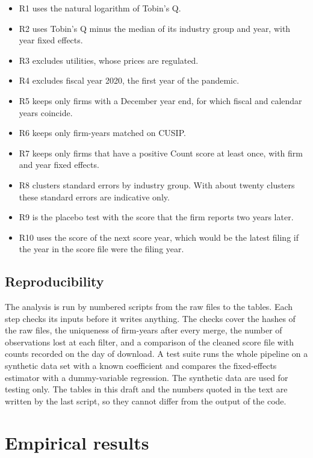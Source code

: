 \documentclass[12pt,a4paper]{article}
\begin{document}
\begin{itemize}
\item R1 uses the natural logarithm of Tobin's Q.
\item R2 uses Tobin's Q minus the median of its industry group and year, with year fixed effects.
\item R3 excludes utilities, whose prices are regulated.
\item R4 excludes fiscal year 2020, the first year of the pandemic.
\item R5 keeps only firms with a December year end, for which fiscal and calendar years coincide.
\item R6 keeps only firm-years matched on CUSIP.
\item R7 keeps only firms that have a positive Count score at least once, with firm and year fixed effects.
\item R8 clusters standard errors by industry group. With about twenty clusters these standard errors are indicative only.
\item R9 is the placebo test with the score that the firm reports two years later.
\item R10 uses the score of the next score year, which would be the latest filing if the year in the score file were the filing year.
\end{itemize}

\subsection{Reproducibility}

The analysis is run by numbered scripts from the raw files to the tables. Each step checks its inputs before it writes anything. The checks cover the hashes of the raw files, the uniqueness of firm-years after every merge, the number of observations lost at each filter, and a comparison of the cleaned score file with counts recorded on the day of download. A test suite runs the whole pipeline on a synthetic data set with a known coefficient and compares the fixed-effects estimator with a dummy-variable regression. The synthetic data are used for testing only. The tables in this draft and the numbers quoted in the text are written by the last script, so they cannot differ from the output of the code.

\section{Empirical results}
\end{document}

